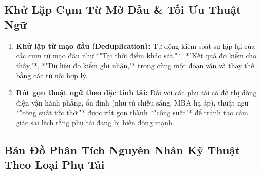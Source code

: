 \documentclass[12pt,a4paper]{article}
\begin{document}
\subsection{Khử Lặp Cụm Từ Mở Đầu \& Tối Ưu Thuật Ngữ}
\begin{enumerate}
  \item \textbf{Khử lặp từ mạo đầu (Deduplication):}
  Tự động kiểm soát sự lặp lại của các cụm từ mạo đầu như *"Tại thời điểm khảo sát,"*, *"Kết quả đo kiểm cho thấy,"*, *"Dữ liệu đo kiểm ghi nhận,"* trong cùng một đoạn văn và thay thế bằng các từ nối hợp lý.
  \item \textbf{Rút gọn thuật ngữ theo đặc tính tải:}
  Đối với các phụ tải có đồ thị dòng điện vận hành phẳng, ổn định (như tủ chiếu sáng, MBA hạ áp), thuật ngữ *"công suất tức thời"* được rút gọn thành *"công suất"* để tránh tạo cảm giác sai lệch rằng phụ tải đang bị biến động mạnh.
\end{enumerate}

\subsection{Bản Đồ Phân Tích Nguyên Nhân Kỹ Thuật Theo Loại Phụ Tải}
\end{document}
